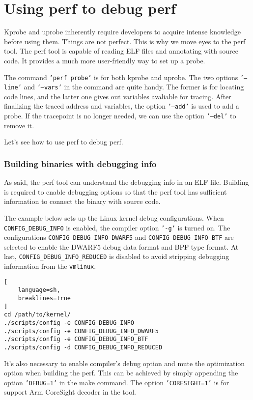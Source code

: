 \documentclass[11pt]{diazessay} %
\def\code#1{\texttt{#1}}
\begin{document}
\section*{Using perf to debug perf}

Kprobe and uprobe inherently require developers to acquire intense knowledge
before using them. Things are not perfect. This is why we move eyes to the
perf tool. The perf tool is capable of reading ELF files and annotating with
source code. It provides a much more user-friendly way to set up a probe.

The command \code{'perf probe'} is for both kprobe and uprobe. The two
options \code{'---line'} and \code{'---vars'} in the command are quite handy.
The former is for locating code lines, and the latter one gives out variables
avaliable for tracing. After finalizing the traced address and variables, the
option \code{'---add'} is used to add a probe. If the tracepoint is no longer
needed, we can use the option \code{'---del'} to remove it.

Let's see how to use perf to debug perf.

\subsubsection*{Building binaries with debugging info}

As said, the perf tool can understand the debugging info in an ELF file.
Building is required to enable debugging options so that the perf tool has
sufficient information to connect the binary with source code.

The example below sets up the Linux kernel debug configurations. When
\code{CONFIG\_DEBUG\_INFO} is enabled, the compiler option \code{'-g'} is
turned on. The configurations \code{CONFIG\_DEBUG\_INFO\_DWARF5} and
\code{CONFIG\_DEBUG\_INFO\_BTF} are selected to enable the DWARF5 debug data
format and BPF type format. At last, \code{CONFIG\_DEBUG\_INFO\_REDUCED} is
disabled to avoid stripping debugging information from the \code{vmlinux}.

\begin{lstlisting}[
  	language=sh,
	breaklines=true
]
cd /path/to/kernel/
./scripts/config -e CONFIG_DEBUG_INFO
./scripts/config -e CONFIG_DEBUG_INFO_DWARF5
./scripts/config -e CONFIG_DEBUG_INFO_BTF
./scripts/config -d CONFIG_DEBUG_INFO_REDUCED
\end{lstlisting}

It's also necessary to enable compiler's debug option and mute the optimization
option when building the perf. This can be achieved by simply appending the
option \code{'DEBUG=1'} in the make command. The option \code{'CORESIGHT=1'} is
for support Arm CoreSight decoder in the tool.
\end{document}
